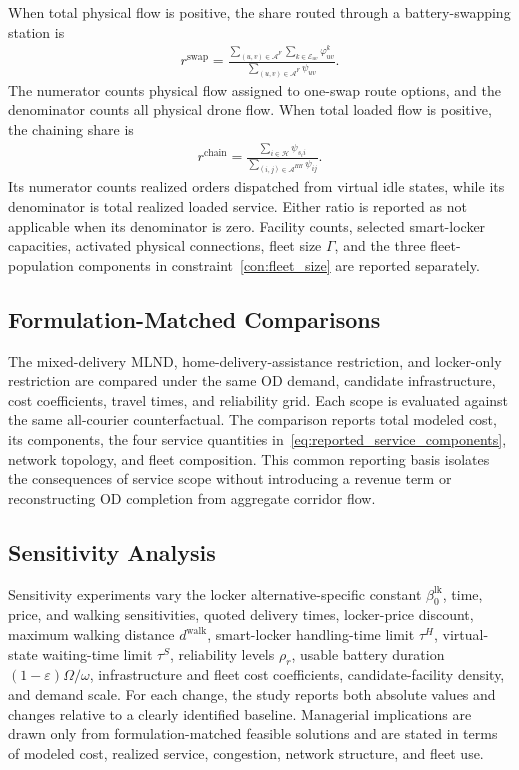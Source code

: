 \documentclass[final,3p,authoryear]{elsarticle}
\begin{document}
When total physical flow is positive, the share routed through a battery-swapping station is
\begin{align}
r^{\mathrm{swap}}
=
\frac{
\displaystyle
\sum_{(u,v)\in\mathcal A^{F}}
\sum_{k\in\mathcal E_{uv}}
\varphi_{uv}^{k}
}{
\displaystyle
\sum_{(u,v)\in\mathcal A^{F}}
\psi_{uv}
}.
\label{eq:swap_flow_ratio}
\end{align}
The numerator counts physical flow assigned to one-swap route options, and the denominator counts all physical drone flow.
When total loaded flow is positive, the chaining share is
\begin{align}
r^{\mathrm{chain}}
=
\frac{
\displaystyle
\sum_{i\in\mathcal H}\psi_{s_i i}
}{
\displaystyle
\sum_{(i,j)\in\mathcal A^{HH}}\psi_{ij}
}.
\label{eq:chaining_ratio}
\end{align}
Its numerator counts realized orders dispatched from virtual idle states, while its denominator is total realized loaded service.
Either ratio is reported as not applicable when its denominator is zero.
Facility counts, selected smart-locker capacities, activated physical connections, fleet size $\Gamma$, and the three fleet-population components in constraint~\eqref{con:fleet_size} are reported separately.

\subsection{Formulation-Matched Comparisons}

The mixed-delivery MLND, home-delivery-assistance restriction, and locker-only restriction are compared under the same OD demand, candidate infrastructure, cost coefficients, travel times, and reliability grid.
Each scope is evaluated against the same all-courier counterfactual.
The comparison reports total modeled cost, its components, the four service quantities in~\eqref{eq:reported_service_components}, network topology, and fleet composition.
This common reporting basis isolates the consequences of service scope without introducing a revenue term or reconstructing OD completion from aggregate corridor flow.

\subsection{Sensitivity Analysis}

Sensitivity experiments vary the locker alternative-specific constant $\beta_0^{\mathrm{lk}}$, time, price, and walking sensitivities, quoted delivery times, locker-price discount, maximum walking distance $d^{\mathrm{walk}}$, smart-locker handling-time limit $\tau^H$, virtual-state waiting-time limit $\tau^S$, reliability levels $\rho_r$, usable battery duration $(1-\varepsilon)\Omega/\omega$, infrastructure and fleet cost coefficients, candidate-facility density, and demand scale.
For each change, the study reports both absolute values and changes relative to a clearly identified baseline.
Managerial implications are drawn only from formulation-matched feasible solutions and are stated in terms of modeled cost, realized service, congestion, network structure, and fleet use.
\end{document}
